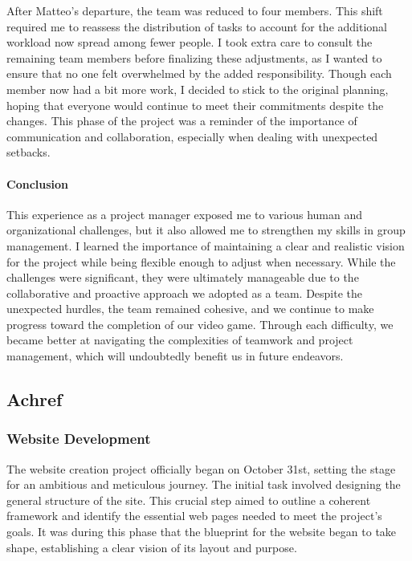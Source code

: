 \documentclass{article}
\begin{document}
After Matteo’s departure, the team was reduced to four members. This shift required me to reassess the distribution of tasks to account for the additional workload now spread among fewer people. I took extra care to consult the remaining team members before finalizing these adjustments, as I wanted to ensure that no one felt overwhelmed by the added responsibility. Though each member now had a bit more work, I decided to stick to the original planning, hoping that everyone would continue to meet their commitments despite the changes. This phase of the project was a reminder of the importance of communication and collaboration, especially when dealing with unexpected setbacks.

\paragraph{Conclusion}\hfill

This experience as a project manager exposed me to various human and organizational challenges, but it also allowed me to strengthen my skills in group management. I learned the importance of maintaining a clear and realistic vision for the project while being flexible enough to adjust when necessary. While the challenges were significant, they were ultimately manageable due to the collaborative and proactive approach we adopted as a team. Despite the unexpected hurdles, the team remained cohesive, and we continue to make progress toward the completion of our video game. Through each difficulty, we became better at navigating the complexities of teamwork and project management, which will undoubtedly benefit us in future endeavors.





\newpage
\subsection{Achref}
\subsubsection{Website Development}\hfill

The website creation project officially began on October 31st, setting the stage for an ambitious and meticulous journey. The initial task involved designing the general structure of the site. This crucial step aimed to outline a coherent framework and identify the essential web pages needed to meet the project's goals. It was during this phase that the blueprint for the website began to take shape, establishing a clear vision of its layout and purpose.\\
\end{document}

